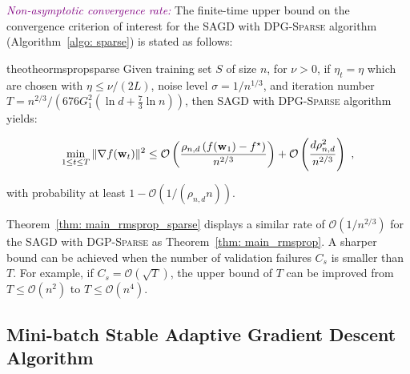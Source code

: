 \documentclass[11pt]{article}
\begin{document}
\textcolor{purple}{\textit{Non-asymptotic convergence rate:}}
The finite-time upper bound on the convergence criterion of interest for the \textsc{SAGD} with \textsc{DPG-Sparse} algorithm (Algorithm~\ref{algo: sparse}) is stated as follows:
\begin{restatable}{theo}{theormspropsparse}
\label{thm: main_rmsprop_sparse}
 Given training set $S$ of size $n$, for $\nu >0$, if $\eta_t = \eta$ which are chosen with $\eta \leq \nu/(2L)$, noise level $\sigma = 1/n^{1/3}$, and iteration number $T = n^{2/3}/\left(676G_1^2(\ln d + \frac{7}{3}\ln n)\right)$, then \textsc{SAGD} with \textsc{DPG-Sparse} algorithm yields:
  \begin{small}
\begin{equation*}
 \min_{1\leq t\leq T}\|\nabla f(\mathbf{w}_t)\|^2 \leq
\mathcal{O} \left( \frac{\rho_{n,d} \left(f(\mathbf{w}_1) - f^\star \right)}{n^{2/3}} \right) +\mathcal{O} \left( \frac{d \rho_{n,d}^2}{n^{2/3}}\right)~,
\end{equation*}
\end{small}
with probability at least $1-\mathcal{O} \left(1/(\rho_{n,d} n)\right)$.
\end{restatable} 
Theorem~\ref{thm: main_rmsprop_sparse} displays a similar rate of $\mathcal{O}(1/n^{2/3})$ for the \textsc{SAGD} with \textsc{DGP-Sparse} as Theorem~\ref{thm: main_rmsprop}. 
A sharper bound can be achieved when the number of validation failures $C_{s}$ is smaller than $T$. 
For example, if $C_{s} = \mathcal{O}(\sqrt{T})$, the upper bound of $T$ can be improved from $T \leq \mathcal{O}(n^2)$ to $T \leq \mathcal{O}(n^4)$.


\vspace{-0.05in}
\subsection{Mini-batch Stable Adaptive Gradient Descent Algorithm}
\label{mini-batch algorithm}
\vspace{-0.05in}
\end{document}
